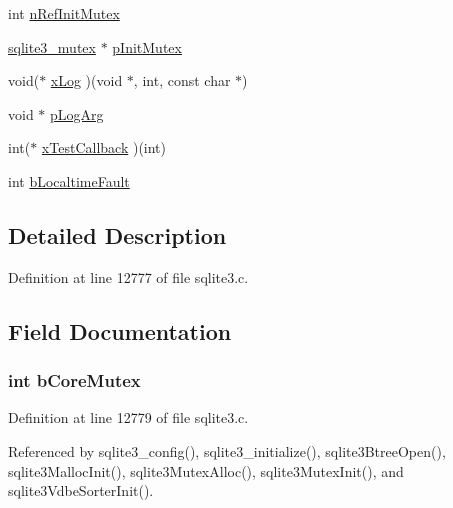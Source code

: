 \begin{DoxyCompactItemize}
\item 
int \hyperlink{struct_sqlite3_config_a82be072aed4e06af77240a619da95f76}{n\+Ref\+Init\+Mutex}
\item 
\hyperlink{structsqlite3__mutex}{sqlite3\+\_\+mutex} $\ast$ \hyperlink{struct_sqlite3_config_a2739bff623111fe6e200c987e10378c9}{p\+Init\+Mutex}
\item 
void($\ast$ \hyperlink{struct_sqlite3_config_a7a8507f3e16dc355181b5f226ec31d19}{x\+Log} )(void $\ast$, int, const char $\ast$)
\item 
void $\ast$ \hyperlink{struct_sqlite3_config_ad86c50ffe8e4c213307b5f89c582d743}{p\+Log\+Arg}
\item 
int($\ast$ \hyperlink{struct_sqlite3_config_ad7abf49f736329ee72d954343b39a706}{x\+Test\+Callback} )(int)
\item 
int \hyperlink{struct_sqlite3_config_a148fb0a51b89a6ecacc43a61b445cbe1}{b\+Localtime\+Fault}
\end{DoxyCompactItemize}


\subsection{Detailed Description}


Definition at line 12777 of file sqlite3.\+c.



\subsection{Field Documentation}
\hypertarget{struct_sqlite3_config_a9b19cb17e4c7a75ebc366513f84ae3bb}{}
\subsubsection[{b\+Core\+Mutex}]{\setlength{\rightskip}{0pt plus 5cm}int b\+Core\+Mutex}\label{struct_sqlite3_config_a9b19cb17e4c7a75ebc366513f84ae3bb}


Definition at line 12779 of file sqlite3.\+c.



Referenced by sqlite3\+\_\+config(), sqlite3\+\_\+initialize(), sqlite3\+Btree\+Open(), sqlite3\+Malloc\+Init(), sqlite3\+Mutex\+Alloc(), sqlite3\+Mutex\+Init(), and sqlite3\+Vdbe\+Sorter\+Init().

\hypertarget{struct_sqlite3_config_a13bc99b79aa8349932f788be7415077c}{}
